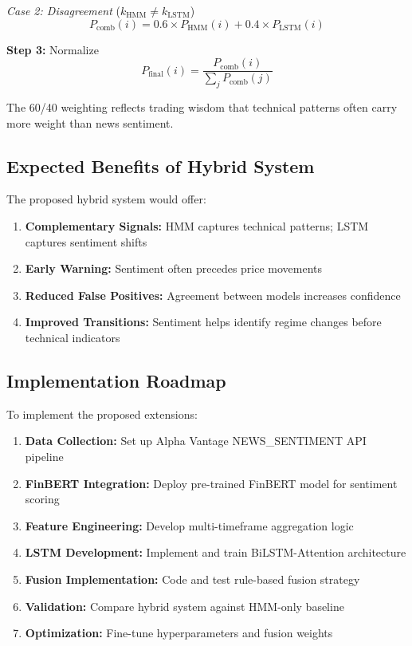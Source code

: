 \documentclass[conference]{IEEEtran}
\begin{document}
\textit{Case 2: Disagreement} ($k_{\text{HMM}} \neq k_{\text{LSTM}}$)
\begin{equation}
P_{\text{comb}}(i) = 0.6 \times P_{\text{HMM}}(i) + 0.4 \times P_{\text{LSTM}}(i)
\end{equation}

\textbf{Step 3:} Normalize
\begin{equation}
P_{\text{final}}(i) = \frac{P_{\text{comb}}(i)}{\sum_{j}P_{\text{comb}}(j)}
\end{equation}

The 60/40 weighting reflects trading wisdom that technical patterns often carry more weight than news sentiment.

\subsection{Expected Benefits of Hybrid System}

The proposed hybrid system would offer:
\begin{enumerate}
\item \textbf{Complementary Signals:} HMM captures technical patterns; LSTM captures sentiment shifts
\item \textbf{Early Warning:} Sentiment often precedes price movements
\item \textbf{Reduced False Positives:} Agreement between models increases confidence
\item \textbf{Improved Transitions:} Sentiment helps identify regime changes before technical indicators
\end{enumerate}

\subsection{Implementation Roadmap}

To implement the proposed extensions:
\begin{enumerate}
\item \textbf{Data Collection:} Set up Alpha Vantage NEWS\_SENTIMENT API pipeline
\item \textbf{FinBERT Integration:} Deploy pre-trained FinBERT model for sentiment scoring
\item \textbf{Feature Engineering:} Develop multi-timeframe aggregation logic
\item \textbf{LSTM Development:} Implement and train BiLSTM-Attention architecture
\item \textbf{Fusion Implementation:} Code and test rule-based fusion strategy
\item \textbf{Validation:} Compare hybrid system against HMM-only baseline
\item \textbf{Optimization:} Fine-tune hyperparameters and fusion weights
\end{enumerate}
\end{document}
